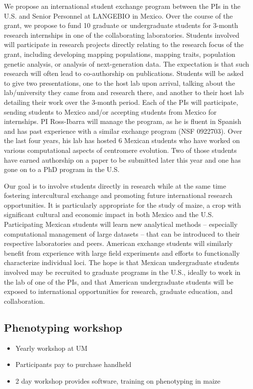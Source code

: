 We propose an international student exchange program between the PIs in the U.S. and Senior Personnel at LANGEBIO in Mexico. Over the course of the grant, we propose to fund 10 graduate or undergraduate students for 3-month research internships in one of the collaborating laboratories. Students involved will participate in research projects directly relating to the research focus of the grant, including developing mapping populations, mapping traits, population genetic analysis, or analysis of next-generation data. The expectation is that such research will often lead to co-authorship on publications. Students will be asked to give two presentations, one to the host lab upon arrival, talking about the lab/university they came from and research there, and another to their host lab detailing their work over the 3-month period.  Each of the PIs will participate, sending students to Mexico and/or accepting students from Mexico for internships. PI Ross-Ibarra will manage the program, as he is fluent in Spanish and has past experience with a similar exchange program (NSF 0922703). Over the last four years, his lab has hosted 6 Mexican students who have worked on various computational aspects of centromere evolution. Two of those students have earned authorship on a paper to be submitted later this year and one has gone on to a PhD program in the U.S.

Our goal is to involve students directly in research while at the same time fostering intercultural exchange and promoting future international research opportunities. It is particularly appropriate for the study of maize, a crop with significant cultural and economic impact in both Mexico and the U.S. Participating Mexican students will learn new analytical methods -- especially computational management of large datasets -- that can be introduced to their respective laboratories and peers. American exchange students will similarly benefit from experience with large field experiments and efforts to functionally characterize individual loci.  The hope is that Mexican undergraduate students involved may be recruited to graduate programs in the U.S., ideally to work in the lab of one of the PIs, and that American undergraduate students will be exposed to international opportunities for research, graduate education, and collaboration.

\subsection*{Phenotyping workshop} %
\begin{itemize}
\item Yearly workshop at UM
\item Participants pay to purchase handheld
\item 2 day workshop provides software, training on phenotyping in maize
\end{itemize}

